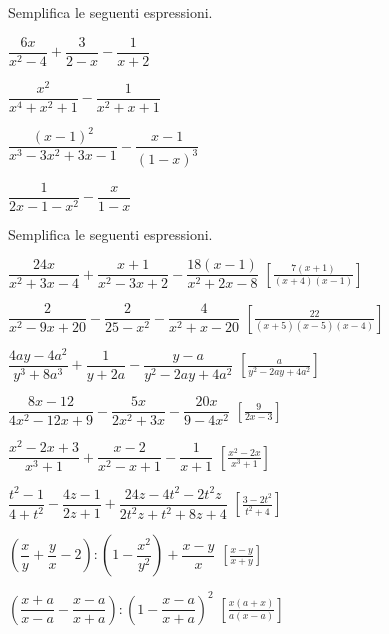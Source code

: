 \begin{esercizio}
\label{ese:19.34}
Semplifica le seguenti espressioni.
\begin{multicols}{2}
\begin{enumeratea}
 \item $\dfrac{6x}{x^{2}-4}+\dfrac{3}{2-x}-\dfrac{1}{x+2}$
 \item $\dfrac{x^{2}}{x^{4}+x^{2}+1}-\dfrac{1}{x^{2}+x+1}$
 \item $\dfrac{(x-1)^{2}}{x^{3}-3x^{2}+3x-1}-\dfrac{x-1}{(1-x)^{3}}$
 \item $\dfrac{1}{2x-1-x^{2}}-\dfrac{x}{1-x}$
\end{enumeratea}
\end{multicols}
\end{esercizio}

\begin{esercizio}[\Ast]
\label{ese:19.35}
Semplifica le seguenti espressioni.
\begin{enumeratea}
 \item $\dfrac{24x}{x^{2}+3x-4}+\dfrac{x+1}{x^{2}-3x+2}-\dfrac{18(x-1)}{x^{2}+2x-8}$
  \hfill $\left[\frac{7(x+1)}{(x+4)(x-1)}\right]$
 \item $\dfrac{2}{x^{2}-9x+20}-\dfrac{2}{25-x^{2}}-\dfrac{4}{x^{2}+x-20}$
  \hfill $\left[\frac{22}{(x+5)(x-5)(x-4)}\right]$
 \item $\dfrac{4ay-4a^{2}}{y^{3}+8a^{3}}+\dfrac{1}{y+2a}-\dfrac{y-a}{y^{2}-2ay+4a^{2}}$
  \hfill $\left[\frac{a}{y^{2}-2ay+4a^{2}}\right]$
 \item $\dfrac{8x-12}{4x^{2}-12x+9}-\dfrac{5x}{2x^{2}+3x}-\dfrac{20x}{9-4x^{2}}$
  \hfill $\left[\frac{9}{2x-3}\right]$
 \item $\dfrac{x^{{2}}-2x+3}{x^{{3}}+1}+\dfrac{x-2}{x^{{2}}-x+1}-\dfrac{1}{x+1}$
  \hfill $\left[\frac{x^{2}-2x}{x^{3}+1}\right]$
 \item $\dfrac{t^{2}-1}{4+t^{2}}-\dfrac{4z-1}{2z+1}+
        \dfrac{24z-4t^{2}-2t^{2}z}{2t^{2}z+t^{2}+8z+4}$
  \hfill $\left[\frac{3-2t^{2}}{t^{2}+4}\right]$
 \item $\left(\dfrac{x}{y}+\dfrac{y}{x}-2\right):\left(1-
        \dfrac{x^{2}}{y^{2}}\right)+\dfrac{x-y}{x}$
  \hfill $\left[\frac{x-y}{x+y}\right]$
 \item $\left(\dfrac{x+a}{x-a}-\dfrac{x-a}{x+a}\right):
        \left(1-\dfrac{x-a}{x+a}\right)^{2}$
  \hfill $\left[\frac{x(a+x)}{a(x-a)}\right]$
\end{enumeratea}
\end{esercizio}


